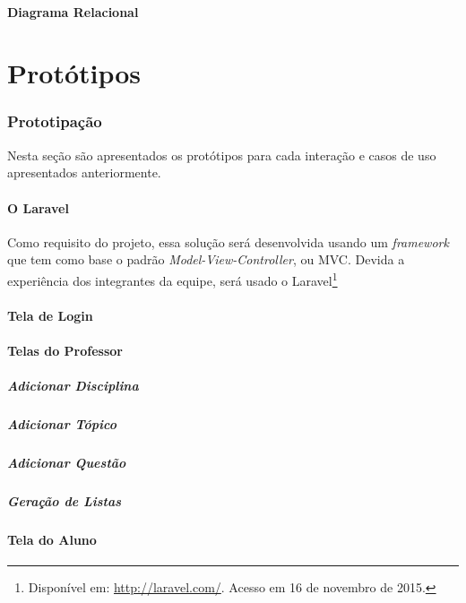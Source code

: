 \documentclass[12pt,oneside,a4paper,article]{abntex2}
\begin{document}
	
		\subsection{Diagrama Relacional}
	

\part{Protótipos}
	\section{Prototipação}
		Nesta seção são apresentados os protótipos para cada interação e casos de uso apresentados anteriormente.
		
		\subsection{O Laravel}
			Como requisito do projeto, essa solução será desenvolvida usando um \textit{framework} que tem como base o padrão \textit{Model-View-Controller}, ou MVC.
			Devida a experiência dos integrantes da equipe, será usado o Laravel\footnote{Disponível em: \url{http://laravel.com/}. Acesso em 16 de novembro de 2015.}
	
		\subsection{Tela de Login}
	
		\subsection{Telas do Professor}
			\subsubsection{Adicionar Disciplina}
			\subsubsection{Adicionar Tópico}
			\subsubsection{Adicionar Questão}
			\subsubsection{Geração de Listas}
		
		\subsection{Tela do Aluno}
		
\end{document}
